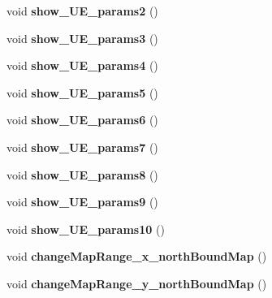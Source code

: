 \begin{DoxyCompactItemize}
\item 
void {\bfseries show\+\_\+\+U\+E\+\_\+params2} ()\hypertarget{class_map__traffic_a79b0de1978f65ddfe8d12f71086ea28e}{}\label{class_map__traffic_a79b0de1978f65ddfe8d12f71086ea28e}

\item 
void {\bfseries show\+\_\+\+U\+E\+\_\+params3} ()\hypertarget{class_map__traffic_a73a75d1775013524863801162b484811}{}\label{class_map__traffic_a73a75d1775013524863801162b484811}

\item 
void {\bfseries show\+\_\+\+U\+E\+\_\+params4} ()\hypertarget{class_map__traffic_ab20d8a7053cb8a202ae4264ddc7ad203}{}\label{class_map__traffic_ab20d8a7053cb8a202ae4264ddc7ad203}

\item 
void {\bfseries show\+\_\+\+U\+E\+\_\+params5} ()\hypertarget{class_map__traffic_a4cda6e16317687223b83cf18fb12ab2f}{}\label{class_map__traffic_a4cda6e16317687223b83cf18fb12ab2f}

\item 
void {\bfseries show\+\_\+\+U\+E\+\_\+params6} ()\hypertarget{class_map__traffic_a77116baf524808ccb32574879ae17941}{}\label{class_map__traffic_a77116baf524808ccb32574879ae17941}

\item 
void {\bfseries show\+\_\+\+U\+E\+\_\+params7} ()\hypertarget{class_map__traffic_a71ef53afb1f4b69bd790042526330832}{}\label{class_map__traffic_a71ef53afb1f4b69bd790042526330832}

\item 
void {\bfseries show\+\_\+\+U\+E\+\_\+params8} ()\hypertarget{class_map__traffic_a1fce48afc430f2d8edacea91a598ced6}{}\label{class_map__traffic_a1fce48afc430f2d8edacea91a598ced6}

\item 
void {\bfseries show\+\_\+\+U\+E\+\_\+params9} ()\hypertarget{class_map__traffic_a2a78fcd3667d98297dd5eee2b3d4f50b}{}\label{class_map__traffic_a2a78fcd3667d98297dd5eee2b3d4f50b}

\item 
void {\bfseries show\+\_\+\+U\+E\+\_\+params10} ()\hypertarget{class_map__traffic_aa287baeb2c9a3ecb5cdb16bd0690f570}{}\label{class_map__traffic_aa287baeb2c9a3ecb5cdb16bd0690f570}

\item 
void {\bfseries change\+Map\+Range\+\_\+x\+\_\+north\+Bound\+Map} ()\hypertarget{class_map__traffic_a4f467f559083b091a1d91fecce7a5764}{}\label{class_map__traffic_a4f467f559083b091a1d91fecce7a5764}

\item 
void {\bfseries change\+Map\+Range\+\_\+y\+\_\+north\+Bound\+Map} ()\hypertarget{class_map__traffic_a30fbd83e876f1808ba9c0744a6d2e5eb}{}\label{class_map__traffic_a30fbd83e876f1808ba9c0744a6d2e5eb}

\end{DoxyCompactItemize}
